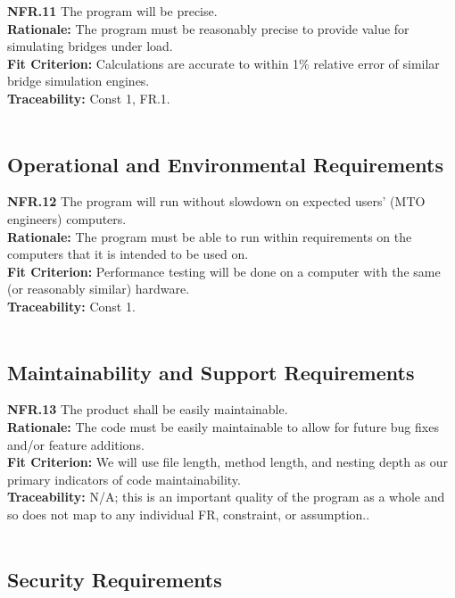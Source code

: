 \documentclass[12pt]{article}
\begin{document}
  \noindent\textbf{NFR.11} The program will be precise.\\
  \textbf{Rationale:} The program must be reasonably precise to provide value for simulating bridges under load.\\
  \textbf{Fit Criterion:} Calculations are accurate to within 1\% relative error of similar bridge simulation engines.\\
  \textbf{Traceability:} Const 1, FR.1.\\\\

\subsection{Operational and Environmental Requirements}

  \textbf{NFR.12} The program will run without slowdown on expected users' (MTO engineers) computers.\\
  \textbf{Rationale:} The program must be able to run within requirements on the computers that it is intended to be used on.\\
  \textbf{Fit Criterion:} Performance testing will be done on a computer with the same (or reasonably similar) hardware.\\
  \textbf{Traceability:} Const 1.\\\\

\subsection{Maintainability and Support Requirements}

  \textbf{NFR.13} The product shall be easily maintainable.\\
  \textbf{Rationale:} The code must be easily maintainable to allow for future bug fixes and/or feature additions.\\
  \textbf{Fit Criterion:} We will use file length, method length, and nesting depth as our primary indicators of code maintainability.\\
  \textbf{Traceability:} N/A; this is an important quality of the program as a whole and so does not map to any individual FR, constraint, or assumption..\\\\

\subsection{Security Requirements}
\end{document}

